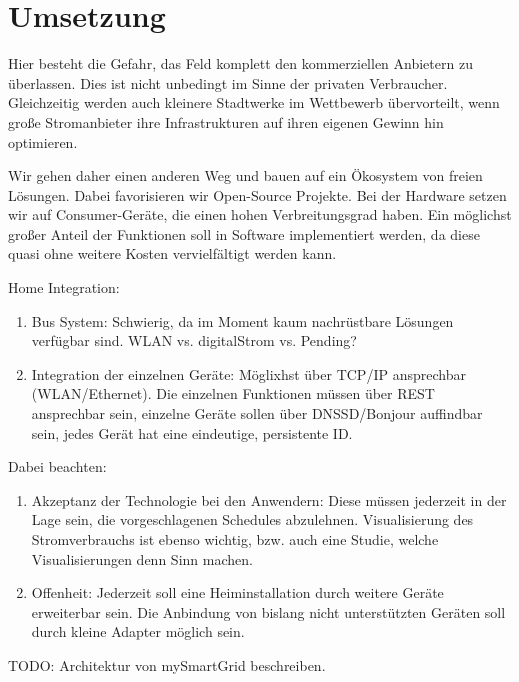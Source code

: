 
\section{Umsetzung}\label{sec:umsetzung}

Hier besteht die Gefahr, das Feld komplett den kommerziellen Anbietern
zu überlassen. Dies ist nicht unbedingt im Sinne der privaten
Verbraucher. Gleichzeitig werden auch kleinere Stadtwerke im Wettbewerb
übervorteilt, wenn große Stromanbieter ihre Infrastrukturen auf ihren
eigenen Gewinn hin optimieren. 

Wir gehen daher einen anderen Weg und bauen auf ein Ökosystem von freien
Lösungen. Dabei favorisieren wir Open-Source Projekte. Bei der Hardware
setzen wir auf Consumer-Geräte, die einen hohen Verbreitungsgrad haben.
Ein möglichst großer Anteil der Funktionen soll in Software
implementiert werden, da diese quasi ohne weitere Kosten vervielfältigt
werden kann.

Home Integration:
\begin{enumerate}
  \item Bus System: Schwierig, da im Moment kaum nachrüstbare Lösungen
	verfügbar sind. WLAN vs. digitalStrom vs. Pending?
  \item Integration der einzelnen Geräte: Möglixhst über TCP/IP
	ansprechbar (WLAN/Ethernet). Die einzelnen Funktionen müssen über
	REST ansprechbar sein, einzelne Geräte sollen über DNSSD/Bonjour
	auffindbar sein, jedes Gerät hat eine eindeutige, persistente ID.
\end{enumerate}

Dabei beachten: 
\begin{enumerate}
  \item Akzeptanz der Technologie bei den Anwendern: Diese müssen
	jederzeit in der Lage sein, die vorgeschlagenen Schedules
	abzulehnen. Visualisierung des Stromverbrauchs ist ebenso wichtig,
	bzw. auch eine Studie, welche Visualisierungen denn Sinn machen.
  \item Offenheit: Jederzeit soll eine Heiminstallation durch weitere
	Geräte erweiterbar sein. Die Anbindung von bislang nicht
	unterstützten Geräten soll durch kleine Adapter möglich sein.
\end{enumerate}

TODO: Architektur von mySmartGrid beschreiben.

